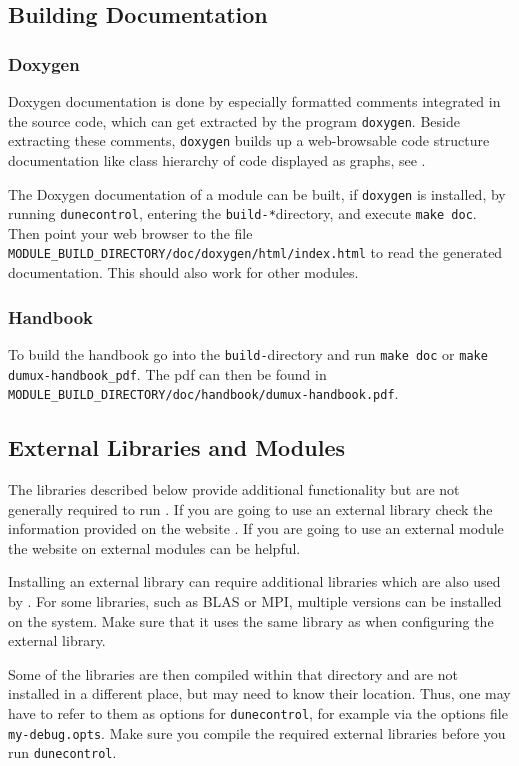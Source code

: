 \subsection{Building Documentation}
\subsubsection{Doxygen}
\label{sec:build-doxy-doc}
Doxygen documentation is done by especially formatted comments integrated in the source code,
which can get extracted by the program \texttt{doxygen}. Beside extracting these comments,
\texttt{doxygen} builds up a web-browsable code structure documentation
like class hierarchy of code displayed as graphs, see \cite{DOXYGEN-HP}.

The Doxygen documentation of a module can be built, if \texttt{doxygen} is installed,
by running \texttt{dunecontrol}, entering the \texttt{build-*}directory, and execute
\texttt{make doc}. Then point your web browser to the file
\texttt{MODULE\_BUILD\_DIRECTORY/doc/doxygen/html/index.html} to read the generated documentation.
This should also work for other \Dune modules.

\subsubsection{Handbook}
To build the \Dumux handbook go into the \texttt{build-}directory and
run \texttt{make doc} or \texttt{make dumux-handbook\_pdf}. The pdf can then be found
in \texttt{MODULE\_BUILD\_DIRECTORY/doc/handbook/dumux-handbook.pdf}.

\subsection{External Libraries and Modules} \label{sec:external-modules-libraries}
The libraries described below provide additional functionality but are not generally required to run \Dumux.
If you are going to use an external library check the information provided on the \Dune website \cite{DUNE-EXT-LIB}.
If you are going to use an external \Dune module the website on external modules \cite{DUNE-EXT-MOD} can be helpful.

Installing an external library can require additional libraries which are also used by \Dune.
For some libraries, such as BLAS or MPI, multiple versions can be installed on the system.
Make sure that it uses the same library as \Dune when configuring the external library.

Some of the libraries are then compiled within that directory and are not installed in
a different place, but \Dune may need to know their location. Thus, one may have to refer to
them as options for \texttt{dunecontrol}, for example via the options file \texttt{my-debug.opts}.
Make sure you compile the required external libraries before you run \texttt{dunecontrol}.

